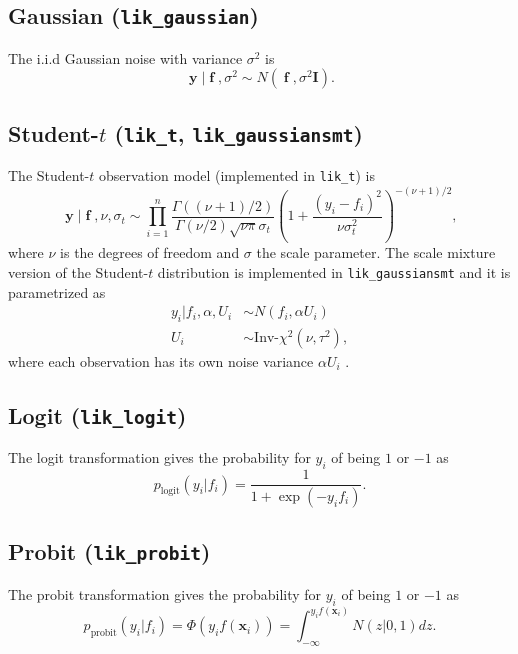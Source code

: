 \documentclass[twoside,11pt]{article}
\DeclareMathOperator{\f}{\mathbf{f}}
\DeclareMathOperator{\y}{\mathbf{y}}
\newcommand{\mb}{\mathbf}
\newcommand{\code}[1]{{\normalfont\texttt{#1}}}
\begin{document}
\subsection*{Gaussian (\code{lik\_gaussian})}

The i.i.d Gaussian noise with variance $\sigma^2$ is
\begin{equation}
\y|\f,\sigma^2 \sim N(\f,\sigma^2\mb{I}).
\end{equation}

\subsection*{Student-$t$ (\code{lik\_t}, \code{lik\_gaussiansmt})}

The Student-$t$ observation model (implemented in \code{lik\_t}) is
\begin{equation}
 \y | \f, \nu, \sigma_t  \sim \prod_{i=1}^n \frac{\Gamma((\nu+1)/2)}{\Gamma(\nu/2)\sqrt{\nu\pi}\sigma_t}\left(1 +
  \frac{(y_i-f_i)^2}{\nu\sigma_t^2} \right)^{-(\nu+1)/2},
\end{equation}
where $\nu$ is the degrees of freedom and $\sigma$ the scale
parameter. The scale
mixture version of the Student-$t$ distribution is implemented in
\code{lik\_gaussiansmt} and it is parametrized as
\begin{align}
y_i | f_i,\alpha, U_i & \sim N(f_i, \alpha U_i)\\
U_i & \sim \text{Inv-}\chi^2(\nu, \tau^2), 
\end{align}
where each observation has its own noise variance $\alpha U_i$
\citep{Neal:1997,Gelman+etal+BDA3:2013}. 
\subsection*{Logit (\code{lik\_logit})}

The logit transformation gives the probability for $y_i$ of being
$1$ or $-1$ as
\begin{equation}
p_{\text{logit}}(y_i|f_i) = \frac{1}{1 + \exp(-y_i f_i)}.
\end{equation}

\subsection*{Probit (\code{lik\_probit})}

The probit transformation gives the probability for $y_i$ of being $1$
or $-1$ as
\begin{equation}
p_{\text{probit}}(y_i|f_i) = \Phi(y_if(\mb{x}_i)) =
\int_{-\infty}^{y_if(\mb{x}_i)} N(z|0,1) d z.
\end{equation}
\end{document}
